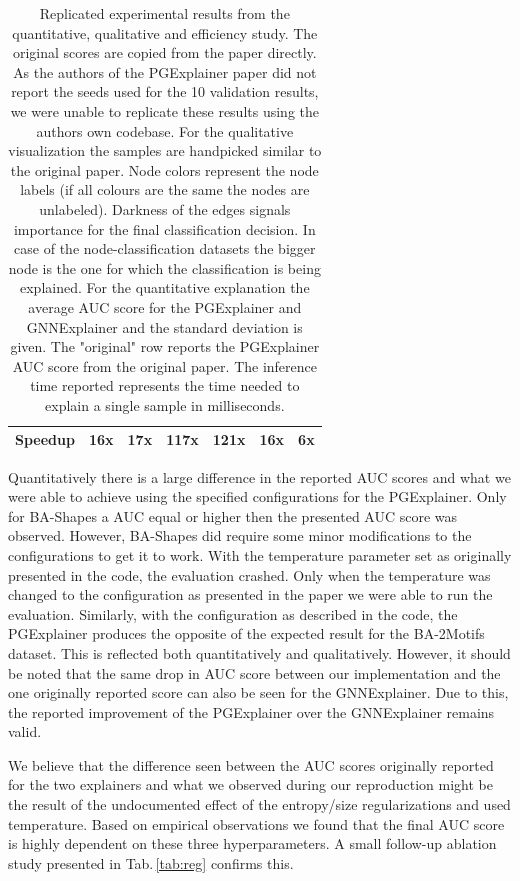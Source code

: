 \begin{table}[h!]
{\begin{tabular}{rcccccc}
Speedup & 16x & 17x & 117x & \multicolumn{1}{l|}{121x} & 16x & 6x \\
\bottomrule
\end{tabular}}
\caption{Replicated experimental results from the quantitative, qualitative and efficiency study. The original scores are copied from the paper directly. As the authors of the PGExplainer paper did not report the seeds used for the 10 validation results, we were unable to replicate these results using the authors own codebase. For the qualitative visualization the samples are handpicked similar to the original paper. Node colors represent the node labels (if all colours are the same the nodes are unlabeled). Darkness of the edges signals importance for the final classification decision. In case of the node-classification datasets the bigger node is the one for which the classification is being explained. For the quantitative explanation the average AUC score for the PGExplainer and GNNExplainer and the standard deviation is given. The "original" row reports the PGExplainer AUC score from the original paper. The inference time reported represents the time needed to explain a single sample in milliseconds.}
\label{tab:reproduction_results2}
\end{table}

Quantitatively there is a large difference in the reported AUC scores and what we were able to achieve using the specified configurations for the PGExplainer. Only for BA-Shapes a AUC equal or higher then the presented AUC score was observed. However, BA-Shapes did require some minor modifications to the configurations to get it to work. With the temperature parameter set as originally presented in the code, the evaluation crashed. Only when the temperature was changed to the configuration as presented in the paper we were able to run the evaluation. Similarly, with the configuration as described in the code, the PGExplainer produces the opposite of the expected result for the BA-2Motifs dataset. This is reflected both quantitatively and qualitatively. However, it should be noted that the same drop in AUC score between our implementation and the one originally reported score can also be seen for the GNNExplainer. Due to this, the reported improvement of the PGExplainer over the GNNExplainer remains valid. 

We believe that the difference seen between the AUC scores originally reported for the two explainers and what we observed during our reproduction might be the result of the undocumented effect of the entropy/size regularizations and used temperature. Based on empirical observations we found that the final AUC score is highly dependent on these three hyperparameters. A small follow-up ablation study presented in Tab.\,\ref{tab:reg} confirms this. 

